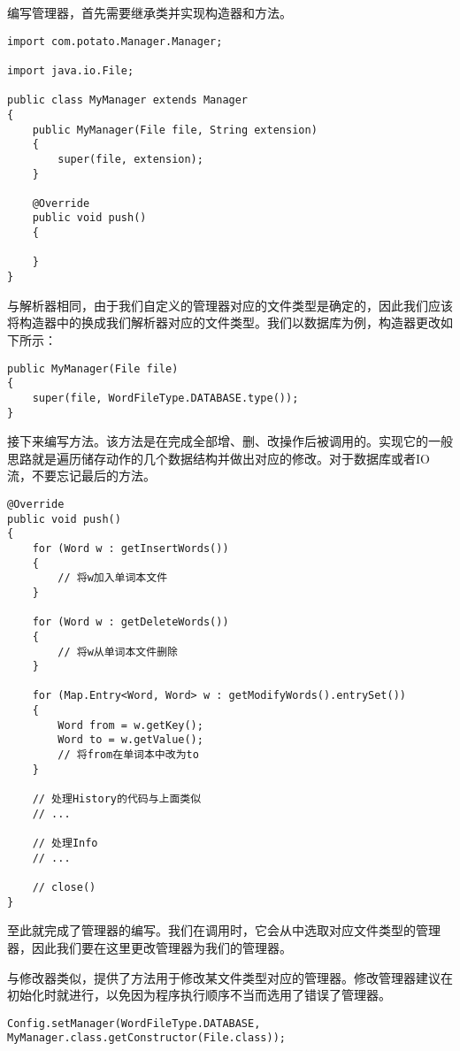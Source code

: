 编写管理器，首先需要继承类并实现构造器和方法。

\begin{lstlisting}[style=Java, caption={初始布局},label={lst:Manager初始布局}]
import com.potato.Manager.Manager;

import java.io.File;

public class MyManager extends Manager
{
    public MyManager(File file, String extension)
    {
        super(file, extension);
    }

    @Override
    public void push()
    {

    }
}
\end{lstlisting}

与解析器相同，由于我们自定义的管理器对应的文件类型是确定的，因此我们应该将构造器中的换成我们解析器对应的文件类型。我们以数据库为例，构造器更改如下所示：

\begin{lstlisting}[style=Java, caption={构造器},label={lst:Manager构造器}]
public MyManager(File file)
{
    super(file, WordFileType.DATABASE.type());
}
\end{lstlisting}

接下来编写方法。该方法是在完成全部增、删、改操作后被调用的。实现它的一般思路就是遍历储存动作的几个数据结构并做出对应的修改。对于数据库或者IO流，不要忘记最后的方法。

\begin{lstlisting}[style=Java, caption={构造器},label={lst:push方法}]
@Override
public void push()
{
    for (Word w : getInsertWords())
    {
        // 将w加入单词本文件
    }

    for (Word w : getDeleteWords())
    {
        // 将w从单词本文件删除
    }

    for (Map.Entry<Word, Word> w : getModifyWords().entrySet())
    {
        Word from = w.getKey();
        Word to = w.getValue();
        // 将from在单词本中改为to
    }

    // 处理History的代码与上面类似
    // ...

    // 处理Info
    // ...

    // close()
}
\end{lstlisting}

至此就完成了管理器的编写。我们在调用时，它会从中选取对应文件类型的管理器，因此我们要在这里更改管理器为我们的管理器。

与修改器类似，提供了方法用于修改某文件类型对应的管理器。修改管理器建议在初始化时就进行，以免因为程序执行顺序不当而选用了错误了管理器。

\begin{lstlisting}[style=Java, caption={修改管理器},label={lst:修改管理器}]
Config.setManager(WordFileType.DATABASE, MyManager.class.getConstructor(File.class));
\end{lstlisting}

